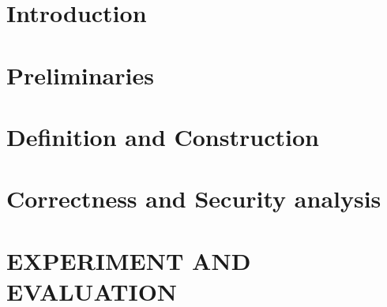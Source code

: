\documentclass[a4paper,13pt,3p,twoside]{report}
\theoremstyle{plain}
\theoremstyle{definition}
\begin{document}
\renewcommand{\listtablename}{LIST OF TABLES}
{\let\oldnumberline\numberline
\renewcommand{\numberline}{Bảng~\oldnumberline}
\listoftables}

\glsaddall 
\renewcommand*{\acronymname}{LIST OF ABBREVIATIONS}
\renewcommand*{\entryname}{Abriviation}
\renewcommand*{\descriptionname}{Full Expression}
\printnoidxglossary[type=\acronymtype]

% 

% 


\newpage
{}

\pagestyle{fancy}
\fancyhf{}
\fancyhead[RE, LO]{\leftmark}
\fancyfoot[RE, LO]{\thepage}

\chapter{Introduction}
\label{chapter:Introduction}

\newpage
\chapter{Preliminaries}


\newpage
\chapter{Definition and Construction}
\label{chapter:Proposed_Construction}


\newpage
\pagestyle{fancy} %
\chapter{Correctness and Security analysis}
\label{chapter:Correctness_and_Security_analysis}


\newpage
\chapter{EXPERIMENT AND EVALUATION}
\label{chapter:Experiment}

\end{document}
